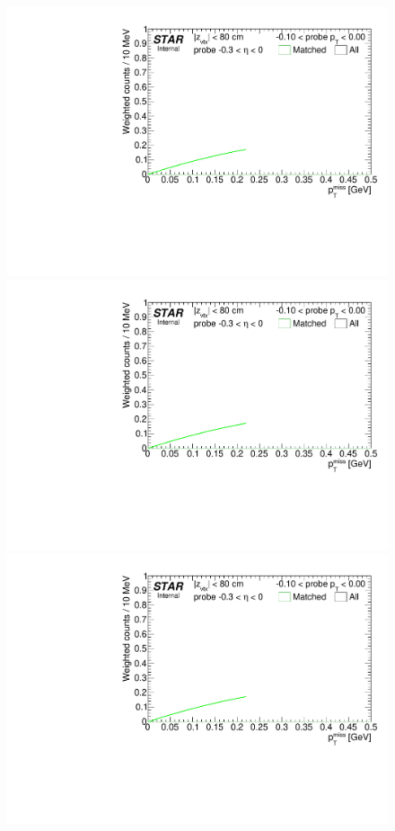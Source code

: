 \begin{figure}[ht]
{}~
\parbox{0.24\textwidth}{
  \centering
  \includegraphics[width=\linewidth,page=7]{graphics/correctionsToEff/TOF_tagAndProbe/Fitting_effVsPt_mc_ETABINS_C.CPT2.pdf}\\
  \includegraphics[width=\linewidth,page=9]{graphics/correctionsToEff/TOF_tagAndProbe/Fitting_effVsPt_mc_ETABINS_C.CPT2.pdf}\\
  \includegraphics[width=\linewidth,page=11]{graphics/correctionsToEff/TOF_tagAndProbe/Fitting_effVsPt_mc_ETABINS_C.CPT2.pdf}

}
\end{figure}
